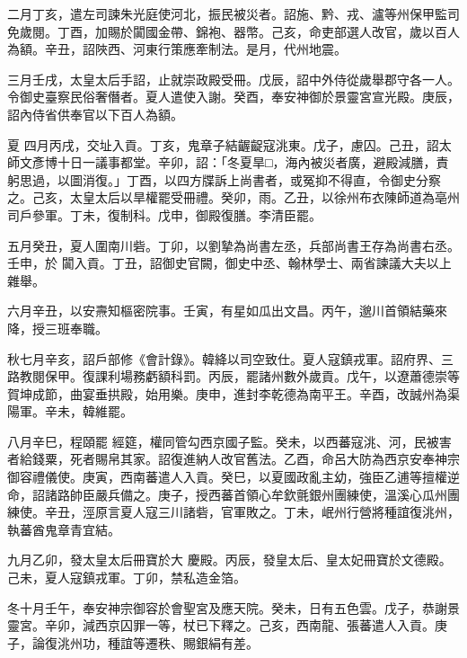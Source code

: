\begin{pinyinscope}
 二月丁亥，遣左司諫朱光庭使河北，振民被災者。詔施、黔、戎、瀘等州保甲監司免歲閱。丁酉，加賜於闐國金帶、錦袍、器幣。己亥，命吏部選人改官，歲以百人為額。辛丑，詔陜西、河東行策應牽制法。是月，代州地震。



 三月壬戌，太皇太后手詔，止就崇政殿受冊。戊辰，詔中外侍從歲舉郡守各一人。令御史臺察民俗奢僭者。夏人遣使入謝。癸酉，奉安神御於景靈宮宣光殿。庚辰，詔內侍省供奉官以下百人為額。



 夏
 四月丙戌，交址入貢。丁亥，鬼章子結齷齪寇洮東。戊子，慮囚。己丑，詔太師文彥博十日一議事都堂。辛卯，詔：「冬夏旱□，海內被災者廣，避殿減膳，責躬思過，以圖消復。」丁酉，以四方牒訴上尚書者，或冤抑不得直，令御史分察之。己亥，太皇太后以旱權罷受冊禮。癸卯，雨。乙丑，以徐州布衣陳師道為亳州司戶參軍。丁未，復制科。戊申，御殿復膳。李清臣罷。



 五月癸丑，夏人圍南川砦。丁卯，以劉摯為尚書左丞，兵部尚書王存為尚書右丞。壬申，於
 闐入貢。丁丑，詔御史官闕，御史中丞、翰林學士、兩省諫議大夫以上雜舉。



 六月辛丑，以安燾知樞密院事。壬寅，有星如瓜出文昌。丙午，邈川首領結藥來降，授三班奉職。



 秋七月辛亥，詔戶部修《會計錄》。韓絳以司空致仕。夏人寇鎮戎軍。詔府界、三路教閱保甲。復課利場務虧額科罰。丙辰，罷諸州數外歲貢。戊午，以遼蕭德崇等賀坤成節，曲宴垂拱殿，始用樂。庚申，進封李乾德為南平王。辛酉，改誠州為渠陽軍。辛未，韓維罷。



 八月辛巳，程頤罷
 經筵，權同管勾西京國子監。癸未，以西蕃寇洮、河，民被害者給錢粟，死者賜帛其家。詔復進納人改官舊法。乙酉，命呂大防為西京安奉神宗御容禮儀使。庚寅，西南蕃遣人入貢。癸巳，以夏國政亂主幼，強臣乙逋等擅權逆命，詔諸路帥臣嚴兵備之。庚子，授西蕃首領心牟欽氈銀州團練使，溫溪心瓜州團練使。辛丑，涇原言夏人寇三川諸砦，官軍敗之。丁未，岷州行營將種誼復洮州，執蕃酋鬼章青宜結。



 九月乙卯，發太皇太后冊寶於大
 慶殿。丙辰，發皇太后、皇太妃冊寶於文德殿。己未，夏人寇鎮戎軍。丁卯，禁私造金箔。



 冬十月壬午，奉安神宗御容於會聖宮及應天院。癸未，日有五色雲。戊子，恭謝景靈宮。辛卯，減西京囚罪一等，杖已下釋之。己亥，西南龍、張蕃遣人入貢。庚子，論復洮州功，種誼等遷秩、賜銀絹有差。




\end{pinyinscope}
